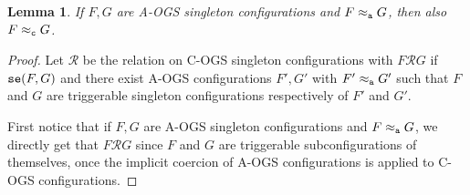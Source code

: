 \documentclass[11pt,a4paper]{amsart}
\theoremstyle{plain}
\theoremstyle{definition}
\theoremstyle{defC}
\theoremstyle{thmC}
\theoremstyle{plain}
\numberwithin{equation}{section}
\newcommand{\AOGS}{\mbox{{\rm A-OGS}}\xspace}      %
\newcommand{\COGS}{\mbox{{\rm C-OGS}}\xspace}      %
\newcommand{\okC}[2]{{\tt se}(#1,#2)}  %
\newcommand{\rmm}[1]{{\tt{\lowercase{#1}}}}
\newcommand{\genwb}[1]{\mathrel{\approx_{\rmm{\lowercase{#1}}}}}       %
\newcommand{\wbC}{\genwb{C}}       %
\newcommand{\wbA}{\genwb{A}}       %
\def\R{{\mathcal R}}
\def\RR{\mathrel{\mathcal R}}
\newcommand{\FF}{F}
\newcommand{\GG}{G}
\theoremstyle{plain}
\newtheorem{lemma}[thm]{Lemma}
\theoremstyle{definition}
\begin{document}
\begin{lemma}
\label{l:OGS_COGS}
If $\FF, \GG$ are \AOGS singleton configurations and 
$\FF \wbA \GG$, then also $\FF \wbC \GG$. 
\end{lemma}

\begin{proof}
  Let $\R$ be the relation on \COGS singleton configurations with $\FF \RR \GG$ if
   $\okC \FF\GG$ and there exist \AOGS configurations $\FF', \GG'$
    with $\FF' \wbA \GG'$ such that 
    $\FF$ and $\GG$ are triggerable singleton configurations
    respectively of $\FF'$ and $\GG'$.

  First notice that if $\FF, \GG$ are \AOGS singleton configurations and 
  $\FF \wbA \GG$, we directly get that 
  $\FF \RR \GG$ since $\FF$ and $\GG$ are 
  triggerable subconfigurations of themselves,
  once the implicit coercion of \AOGS configurations is applied
  to \COGS configurations.
  

\end{proof}
\end{document}
